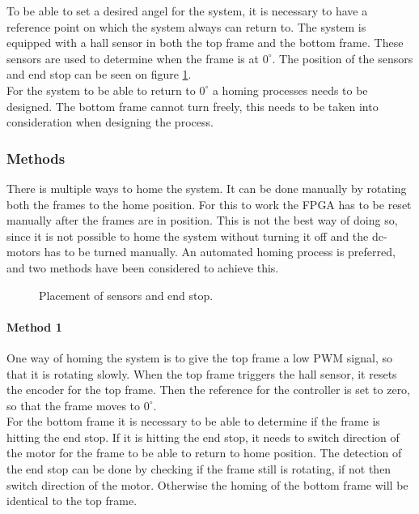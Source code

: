 \documentclass[../../../main]{subfiles}
\begin{document}
 
To be able to set a desired angel for the system, it is necessary to have a reference point on which the system always can return to. 
The system is equipped with a hall sensor in both the top frame and the bottom frame.
These sensors are used to determine when the frame is at $0^\circ$. The position of the sensors and end stop can be seen on figure \ref{fig:homing_system}.
\\
For the system to be able to return to $0^\circ$ a homing processes needs to be designed.
The bottom frame cannot turn freely, this needs to be taken into consideration when designing the process.
\subsubsection{Methods} 
There is multiple ways to home the system. It can be done manually by rotating both the frames to the home position.
For this to work the FPGA has to be reset manually after the frames are in position.
This is not the best way of doing so, since it is not possible to home the system without turning it off and the dc-motors has to be turned manually.
An automated homing process is preferred, and two methods have been considered to achieve this. 
\begin{figure}[H]
  \centering
  \def\svgwidth{\textwidth}
  
  \caption{Placement of sensors and end stop.}
  \label{fig:homing_system}
\end{figure}
\paragraph{Method 1}%
\label{par:method_1}
One way of homing the system is to give the top frame a low PWM signal, so that it is rotating slowly. 
When the top frame triggers the hall sensor, it resets the encoder for the top frame. 
Then the reference for the controller is set to zero, so that the frame moves to $0^\circ$. 
\\
For the bottom frame it is necessary to be able to determine if the frame is hitting the end stop. 
If it is hitting the end stop, it needs to switch direction of the motor for the frame to be able to return to home position.
The detection of the end stop can be done by checking if the frame still is rotating, if not then switch direction of the motor.
Otherwise the homing of the bottom frame will be identical to the top frame.
\end{document}
